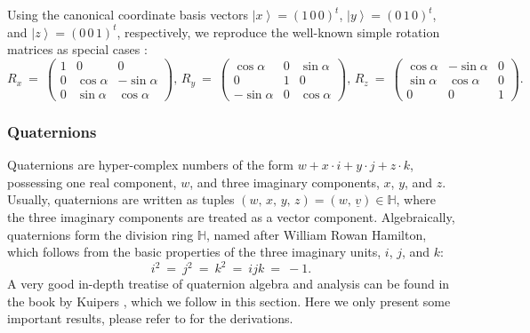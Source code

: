 Using the canonical coordinate basis vectors $\left| x \right> = \left( 1\,0\,0 \right)^t$, $\left| y \right> = \left( 0\,1\,0 \right)^t$,
and $\left| z \right> = \left( 0\,0\,1 \right)^t$, respectively, we reproduce the well-known simple rotation matrices as 
special cases \cite{TODO}:
\begin{equation}
	R_x \ =\ 
		\left( \begin{array}{ccc} 
			1 &            0 &            0  \\
			0 &  \cos \alpha & -\sin \alpha  \\
			0 & \sin \alpha  &  \cos \alpha
		\end{array} \right),\,
	R_y \ =\ 
		\left( \begin{array}{ccc} 
			  \cos \alpha &         0 &  \sin \alpha \\
			           0  &         1 &            0 \\
			-\sin \alpha  &         0 &  \cos \alpha
		\end{array} \right),\,
	R_z \ =\ 
		\left( \begin{array}{ccc} 
			 \cos \alpha & -\sin \alpha &             0  \\
			\sin \alpha  &  \cos \alpha &             0  \\
			           0 &            0 &             1
		\end{array} \right).
\end{equation}


\subsubsection{Quaternions}
Quaternions are hyper-complex numbers of the form $w + x \cdot i + y \cdot j + z \cdot k$, possessing one real 
component, $w$, and three imaginary components, $x$, $y$, and $z$. 
Usually, quaternions are written as tuples $\left( w,\,x,\,y,\,z \right) = \left( w,\,\underline{v} \right) \in \mathbb{H}$,
where the three imaginary components are treated as a vector component.
Algebraically, quaternions form the division ring $\mathbb{H}$, named after William Rowan Hamilton, which follows from the 
basic properties of the three imaginary units, $i$, $j$, and $k$:
\begin{equation}
	i^2 \ =\ j^2 \ =\ k^2 \ =\ ijk \ =\ -1.
	\label{eq:quat_basic}
\end{equation}
A very good in-depth treatise of quaternion algebra and analysis can be found in the book by Kuipers \cite{Kuipers2002},
which we follow in this section.
Here we only present some important results, please refer to \cite{Kuipers2002} for the derivations.

